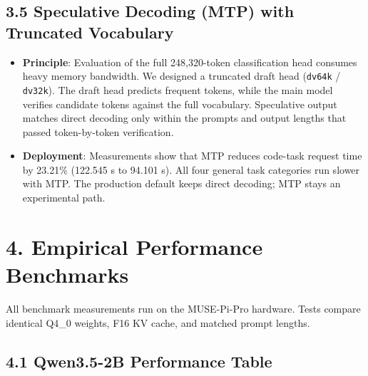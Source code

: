 \documentclass[10pt,a4paper]{article}
\begin{document}
\subsection{3.5 Speculative Decoding (MTP) with Truncated Vocabulary}
\begin{itemize}
  \item \textbf{Principle}: Evaluation of the full 248,320-token classification head consumes heavy memory bandwidth. We designed a truncated draft head (\texttt{dv64k} / \texttt{dv32k}). The draft head predicts frequent tokens, while the main model verifies candidate tokens against the full vocabulary. Speculative output matches direct decoding only within the prompts and output lengths that passed token-by-token verification.
  \item \textbf{Deployment}: Measurements show that MTP reduces code-task request time by 23.21\% (122.545 s to 94.101 s). All four general task categories run slower with MTP. The production default keeps direct decoding; MTP stays an experimental path.
\end{itemize}

\section{4. Empirical Performance Benchmarks}

All benchmark measurements run on the MUSE-Pi-Pro hardware.
Tests compare identical Q4\_0 weights, F16 KV cache, and matched prompt lengths.

\subsection{4.1 Qwen3.5-2B Performance Table}
\end{document}

